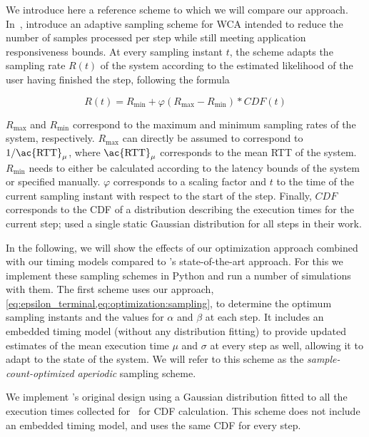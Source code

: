 We introduce here a reference scheme to which we will compare our approach.
In~\cite{Wang2019Towards}, \citeauthor{Wang2019Towards} introduce an adaptive sampling scheme for \ac{WCA} intended to reduce the number of samples processed per step while still meeting application responsiveness bounds.
At every sampling instant \( t \), the scheme adapts the sampling rate \( R(t) \) of the system according to the estimated likelihood of the user having finished the step,
following the formula 

\begin{equation}
    R(t) = R_\text{min} + \varphi\left( R_\text{max} - R_\text{min} \right) * CDF(t)
\end{equation}

\( R_\text{max} \) and \( R_\text{min} \) correspond to the maximum and minimum sampling rates of the system, respectively.
\( R_\text{max} \) can directly be assumed to correspond to \( 1 / \text{\ac{RTT}}_\mu \), where \( \text{\ac{RTT}}_\mu \) corresponds to the mean \ac{RTT} of the system.
\( R_\text{min} \) needs to either be calculated according to the latency bounds of the system or specified manually.
\( \varphi \) corresponds to a scaling factor and \( t \) to the time of the current sampling instant with respect to the start of the step.
Finally, \( CDF \) corresponds to the \ac{CDF} of a distribution describing the execution times for the current step; \citeauthor{Wang2019Towards} used a single static Gaussian distribution for all steps in their work.

\medskip

In the following, we will show the effects of our optimization approach combined with our timing models compared to \textcite{Wang2019Towards}'s state-of-the-art approach.
For this we implement these sampling schemes in Python and run a number of simulations with them.
The first scheme uses our approach, \cref{eq:epsilon_terminal,eq:optimization:sampling}, to determine the optimum sampling instants and the values for \( \alpha \) and \( \beta \) at each step.
It includes an embedded timing model (without any distribution fitting) to provide updated estimates of the mean execution time \( \mu \) and \( \sigma \) at every step as well, allowing it to adapt to the state of the system.
We will refer to this scheme as the \emph{sample-count-optimized aperiodic} sampling scheme.

We implement \citeauthor{Wang2019Towards}'s original design using a Gaussian distribution fitted to all the execution times collected for~\cite{olguinmunoz:impact2021} for \ac{CDF} calculation.
This scheme does not include an embedded timing model, and uses the same \ac{CDF} for every step.

